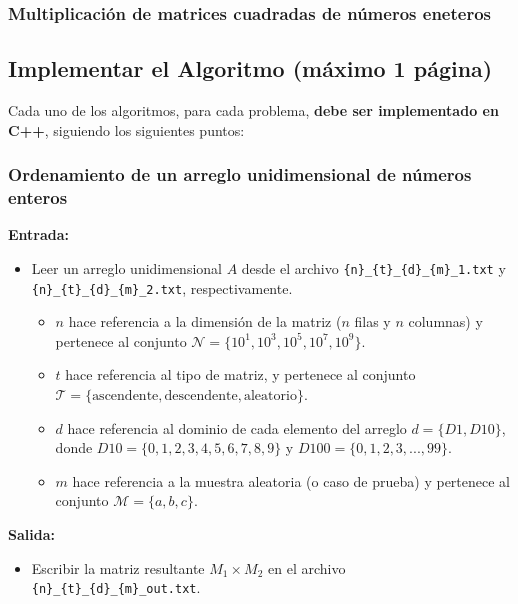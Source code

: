 \subsubsection{Multiplicación de matrices cuadradas de números eneteros}



\subsection{Implementar el Algoritmo (máximo 1 página)}

\begin{mdframed}
Cada uno de los algoritmos, para cada problema, \textbf{debe ser implementado en C++}, siguiendo los siguientes puntos:
\end{mdframed}

\subsubsection{Ordenamiento de un arreglo unidimensional de números enteros}

\textbf{Entrada:}
\begin{itemize}
    \item Leer un arreglo unidimensional $A$ desde el archivo \texttt{\{n\}\_\{t\}\_\{d\}\_\{m\}\_1.txt} y \texttt{\{n\}\_\{t\}\_\{d\}\_\{m\}\_2.txt}, respectivamente.
    \begin{itemize}
        \item $n$ hace referencia a la dimensión de la matriz ($n$ filas y $n$ columnas) y pertenece al conjunto $\mathcal{N} = \{10^1, 10^3, 10^5, 10^{7}, 10^{9}\}$.
        \item $t$ hace referencia al tipo de matriz, y pertenece al conjunto $\mathcal{T} = \{ \text{ascendente}, \text{descendente}, \text{aleatorio} \}$.
        \item $d$ hace referencia al dominio de cada elemento del arreglo $d = \{D1, D10\}$, donde $D10 = \{0,1,2,3,4,5,6,7,8,9\}$ y $D100 = \{0,1,2,3,...,99\}$.
        \item $m$ hace referencia a la muestra aleatoria (o caso de prueba) y pertenece al conjunto $\mathcal{M} = \{a,b,c\}$.
    \end{itemize}
\end{itemize}

\textbf{Salida:}
\begin{itemize}
    \item Escribir la matriz resultante $M_1 \times M_2$ en el archivo \texttt{\{n\}\_\{t\}\_\{d\}\_\{m\}\_out.txt}.
\end{itemize}

